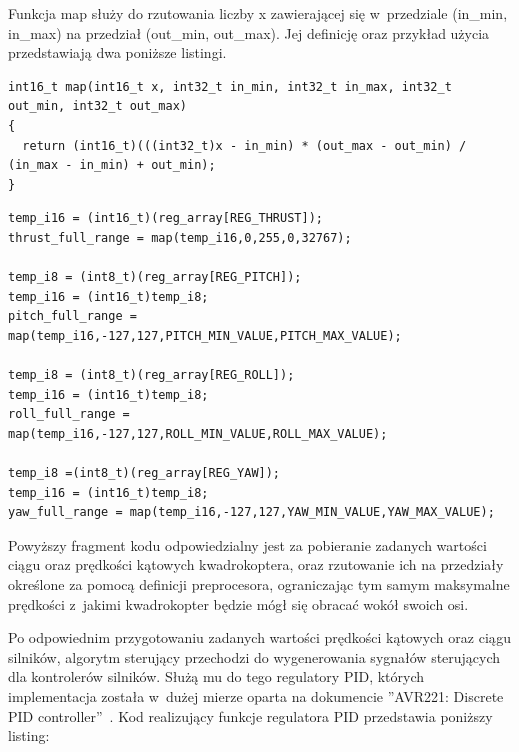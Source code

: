 \documentclass[11pt, twoside]{Thesis} %
\begin{document}
Funkcja map służy do rzutowania liczby x zawierającej się w~przedziale (in\_min, in\_max) na przedział (out\_min, out\_max). Jej definicję oraz przykład użycia przedstawiają dwa poniższe listingi.

\begin{lstlisting}
int16_t map(int16_t x, int32_t in_min, int32_t in_max, int32_t out_min, int32_t out_max)
{
  return (int16_t)(((int32_t)x - in_min) * (out_max - out_min) / (in_max - in_min) + out_min);
}
\end{lstlisting}



\begin{lstlisting}
temp_i16 = (int16_t)(reg_array[REG_THRUST]);
thrust_full_range = map(temp_i16,0,255,0,32767);

temp_i8 = (int8_t)(reg_array[REG_PITCH]);
temp_i16 = (int16_t)temp_i8;
pitch_full_range = map(temp_i16,-127,127,PITCH_MIN_VALUE,PITCH_MAX_VALUE);

temp_i8 = (int8_t)(reg_array[REG_ROLL]);
temp_i16 = (int16_t)temp_i8;
roll_full_range = map(temp_i16,-127,127,ROLL_MIN_VALUE,ROLL_MAX_VALUE);

temp_i8 =(int8_t)(reg_array[REG_YAW]);
temp_i16 = (int16_t)temp_i8;
yaw_full_range = map(temp_i16,-127,127,YAW_MIN_VALUE,YAW_MAX_VALUE);
\end{lstlisting}

Powyższy fragment kodu odpowiedzialny jest za pobieranie zadanych wartości ciągu oraz prędkości kątowych kwadrokoptera, oraz rzutowanie ich na przedziały określone za pomocą definicji preprocesora, ograniczając tym samym maksymalne prędkości z~jakimi kwadrokopter będzie mógł się obracać wokół swoich osi.

Po odpowiednim przygotowaniu zadanych wartości prędkości kątowych oraz ciągu silników, algorytm sterujący przechodzi do wygenerowania sygnałów sterujących dla kontrolerów silników. Służą mu do tego regulatory PID, których implementacja została w~dużej mierze oparta na dokumencie ''AVR221: Discrete PID controller''~\cite{ds_avrpid}. Kod realizujący funkcje regulatora PID przedstawia poniższy listing:
\end{document}
